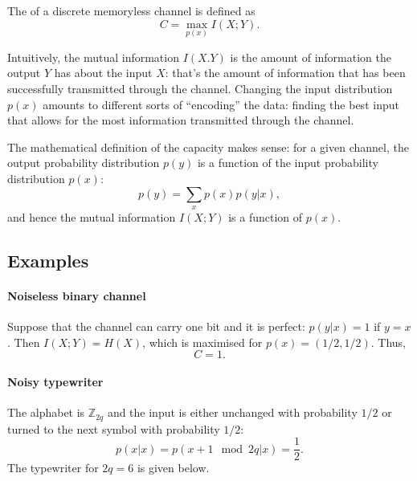 \documentclass[a4paper, 11pt, openany]{book}
\begin{document}
    The  of a discrete memoryless channel is defined as
    \[
        C = \max_{p(x)} I(X;Y).
    \]

    Intuitively, the mutual information $I(X.Y)$ is the amount of information the output $Y$ has about the input $X$: that's the amount of information that has been successfully transmitted through the channel. Changing the input distribution $p(x)$ amounts to different sorts of ``encoding'' the data: finding the best input that allows for the most information transmitted through the channel.

    The mathematical definition of the capacity makes sense: for a given channel, the output probability distribution $p(y)$ is a function of the input probability distribution $p(x)$:
    \[
        p(y) = \sum_x p(x) p(y | x),
    \]
    and hence the mutual information $I(X;Y)$ is a function of $p(x)$.

    \subsection{Examples}

    \paragraph{Noiseless binary channel}
    Suppose that the channel can carry one bit and it is perfect: $p(y|x) = 1$ if $y=x$. Then $I(X;Y) = H(X)$, which is maximised for $p(x) = (1/2, 1/2)$.
    Thus,
    $$
        C = 1.
    $$



    \paragraph{Noisy typewriter}
    The alphabet is $\mathbb{Z}_{2q}$ and the input is either unchanged with probability $1/2$ or turned to the next symbol with probability $1/2$:
    \[
        p(x|x) = p(x+1 \mod 2q | x) = \frac{1}{2}.
    \]
    The typewriter for $2q = 6$ is given below.\\
\end{document}
